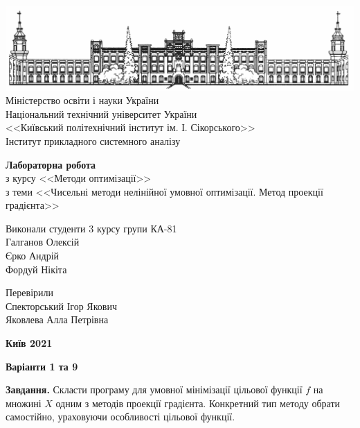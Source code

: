 \documentclass{extreport}
\begin{document}
\begin{titlepage}
    \thispagestyle{empty}
    \begin{center}
        \includegraphics[width = \textwidth]{kpi}
        Міністерство освіти і науки України\\
        Національний технічний університет України\\
        <<Київський політехнічний інститут ім. І. Сікорського>>\\
        Інститут прикладного системного аналізу
    \end{center}
    \vspace{40mm}
    \begin{center}
        \textbf{Лабораторна робота} \\
        з курсу <<Методи оптимізації>> \\
        з теми <<Чисельні методи нелінійної умовної оптимізації. 
        Метод проекції градієнта>>
    \end{center}
    \vspace{20mm}
    \begin{flushleft}
        Виконали студенти 3 курсу групи КА-81 \\
        Галганов Олексій \\
        Єрко Андрій \\
        Фордуй Нікіта
    \end{flushleft}
    \begin{flushright}
        Перевірили \\
        Спекторський Ігор Якович \\
        Яковлева Алла Петрівна
    \end{flushright}
    \vspace{30mm}
    \begin{center}
        \textbf{Київ 2021}
    \end{center}
\end{titlepage}

\begin{center}
    \textbf{Варіанти 1 та 9}
\end{center}
\textbf{Завдання.} Скласти програму для умовної мінімізації цільової функції $f$ на множині $X$
одним з методів проекції градієнта. Конкретний тип методу обрати
самостійно, ураховуючи особливості цільової функції.
\end{document}
